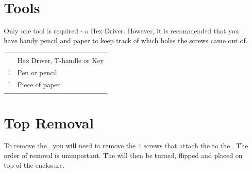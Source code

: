 \section{Tools}

Only one tool is required - a  Hex Driver.  However, it is
recommended that you have handy pencil and paper to keep track of which holes
the screws came out of.

\begin{table}[H]
\centering
\begin{tabu} { X[1,r,m] | X[6,l,m] }
  \thrule
   &  \\  &  Hex Driver, T-handle or Key \\ 
  1 & Pen or pencil \\ 
  1 & Piece of paper \\
  \bhrule
\end{tabu}
\end{table}

\section{Top Removal} \label{Top Removal}

To remove the , you will need to remove the \num{4} screws that attach
the  to the .  The order of removal is unimportant.  The 
will then be turned, flipped and placed on top of the enclosure.


